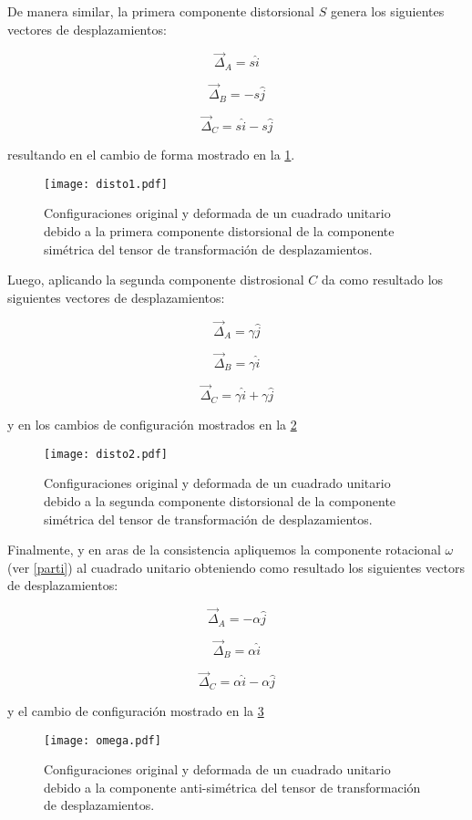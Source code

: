 \documentclass[../notas medios.tex]{subfiles}
\begin{document}
De manera similar, la primera componente distorsional $S$ genera los siguientes vectores de desplazamientos:

\[{{\vec \Delta }_A} = s\hat i\]

\[{{\vec \Delta }_B} =  - s\hat j\]

\[{{\vec \Delta }_C} = s\hat i - s\hat j\]

resultando en el cambio de forma mostrado en la \cref{disto1}.

\begin{figure}[H]
\centering
	\texttt{[image: disto1.pdf]}
	\caption{Configuraciones original y deformada de un cuadrado unitario debido a la primera componente distorsional de la componente simétrica del tensor de transformación de desplazamientos.}
	\label{disto1}
\end{figure}

Luego, aplicando la segunda componente distrosional $C$ da como resultado los siguientes vectores de desplazamientos:

\[{{\vec \Delta }_A} = \gamma \hat j\]

\[{{\vec \Delta }_B} = \gamma \hat i\]

\[{{\vec \Delta }_C} = \gamma \hat i + \gamma \hat j\]

y en los cambios de configuración mostrados en la \cref{disto2}

\begin{figure}[H]
\centering
	\texttt{[image: disto2.pdf]}
	\caption{Configuraciones original y deformada de un cuadrado unitario debido a la segunda componente distorsional de la componente simétrica del tensor de transformación de desplazamientos.}
	\label{disto2}
\end{figure}

Finalmente, y en aras de la consistencia apliquemos la componente rotacional $\omega$ (ver \cref{parti}) al cuadrado unitario obteniendo como resultado los siguientes vectors de desplazamientos:

\[{{\vec \Delta }_A} =  - \alpha \hat j\]

\[{{\vec \Delta }_B} = \alpha \hat i\]

\[{{\vec \Delta }_C} = \alpha \hat i - \alpha \hat j\]

y el cambio de configuración mostrado en la \cref{rotarota}

\begin{figure}[H]
\centering
	\texttt{[image: omega.pdf]}
	\caption{Configuraciones original y deformada de un cuadrado unitario debido a la componente anti-simétrica del tensor de transformación de desplazamientos.}
	\label{rotarota}
\end{figure}
\end{document}
